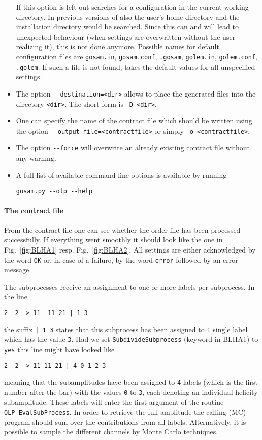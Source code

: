 \begin{itemize}
   If  this option is left out \gosam{} searches for a configuration in the current working directory. In previous versions of \gosam also the user's home directory and the \gosam installation directory would be searched. Since this can and will lead to unexpected behaviour (when settings are overwritten without the user realizing it), this is not done anymore.
   Possible names for default configuration files are \texttt{gosam.in},
   \texttt{gosam.conf}, \texttt{.gosam}, \texttt{golem.in},
   \texttt{golem.conf}, \texttt{.golem}.
   If such a file is not found, \gosam{} takes the default values for 
   all unspecified settings.
\item  The option \lstinline[style=sh]|--destination=<dir>| allows 
   to place the generated files into the directory \texttt{<dir>}.
   The short form is \texttt{-D <dir>}.
\item One can specify the name of the contract file which should be written
   using the option \lstinline[style=sh]|--output-file=<contractfile>| or simply
   \lstinline[style=sh]|-o <contractfile>|.
\item The option \lstinline[style=sh]|--force| will overwrite an already existing
   contract file without any warning. 
\item A full list of available command line options is available by running 
\begin{lstlisting}[style=sh]
gosam.py --olp --help
\end{lstlisting}
\end{itemize}

\paragraph{The contract file}
From the contract file one can see whether the order file has been processed successfully.
If everything went smoothly it should look like the one in Fig.~\ref{fig:BLHA1}
resp. Fig.~\ref{fig:BLHA2}.
All settings are either acknowledged by the word \texttt{OK} or, in case
of a failure, by the word \texttt{error} followed by an error message.


The subprocesses receive an assignment to one or more
labels per subprocess. In the line
\begin{lstlisting}[style=in]
2 -2 -> 11 -11 21 | 1 3
\end{lstlisting}
the suffix \texttt{| 1 3}
states that this subprocess has been assigned to \texttt{1}
single label which has the value \texttt{3}. 
Had we set \texttt{SubdivideSubprocess} (keyword in BLHA1)
to \texttt{yes} this line might have looked like
\begin{lstlisting}[style=in]
2 -2 -> 11 11 21 | 4 0 1 2 3
\end{lstlisting}
meaning that the subamplitudes
have been assigned to
\texttt{4} labels (which is the first number after the bar) with
the values \texttt{0} to \texttt{3}, each denoting 
an individual helicity subamplitude. These labels will enter the
first argument of the routine \texttt{OLP\_EvalSubProcess}.
In order to retrieve the full amplitude the calling (MC) program should sum
over the contributions from all labels. Alternatively, it is possible to
sample the different channels by Monte Carlo techniques.

